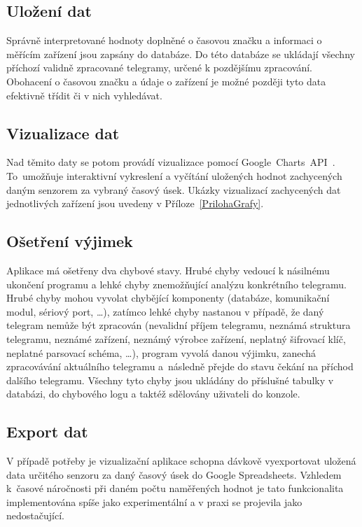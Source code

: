 \subsection{Uložení dat}
Správně interpretované hodnoty doplněné o časovou značku a informaci o měřícím zařízení jsou zapsány do databáze. Do této databáze se ukládají všechny příchozí validně zpracované telegramy, určené k pozdějšímu zpracování. Obohacení o časovou značku a údaje o zařízení je možné později tyto data efektivně třídit či v nich vyhledávat.

\subsection{Vizualizace dat}
Nad těmito daty se potom provádí vizualizace pomocí Google~Charts~API~\cite{uvod_google_charts_api}. To~umožňuje interaktivní vykreslení a vyčítání uložených hodnot zachycených daným senzorem za vybraný časový úsek. Ukázky vizualizací zachycených dat jednotlivých zařízení jsou uvedeny v Příloze~\ref{PrilohaGrafy}.

\subsection{Ošetření výjimek}
Aplikace má ošetřeny dva chybové stavy. Hrubé chyby vedoucí k násilnému ukončení programu a lehké chyby znemožňující analýzu konkrétního telegramu. Hrubé chyby mohou vyvolat chybějící komponenty (databáze, komunikační modul, sériový port, \ldots), zatímco lehké chyby nastanou v případě, že daný telegram nemůže být zpracován (nevalidní příjem telegramu, neznámá struktura telegramu, neznámé zařízení, neznámý výrobce zařízení, neplatný šifrovací klíč, neplatné parsovací schéma, \ldots ), program vyvolá danou výjimku, zanechá zpracovávání aktuálního telegramu a~následně přejde do stavu čekání na příchod dalšího telegramu.
Všechny tyto chyby jsou ukládány do příslušné tabulky v databázi, do chybového logu a taktéž sdělovány uživateli do konzole.

\subsection{Export dat}
V případě potřeby je vizualizační aplikace schopna dávkově vyexportovat uložená data určitého senzoru za daný časový úsek do Google Spreadsheets. Vzhledem k~časové náročnosti při daném počtu naměřených hodnot je tato funkcionalita implementována spíše jako experimentální a v praxi se projevila jako nedostačující.



